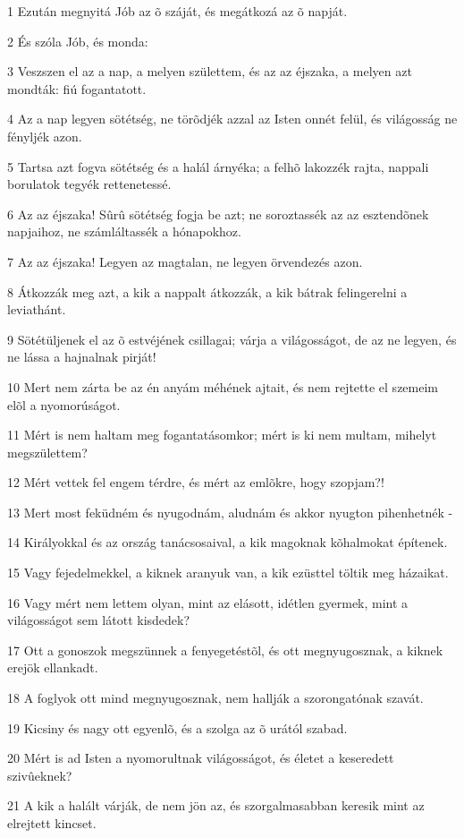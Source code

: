 \par 1 Ezután megnyitá Jób az õ száját, és megátkozá az õ napját.
\par 2 És szóla Jób, és monda:
\par 3 Veszszen el az a nap, a melyen születtem, és az az éjszaka, a melyen azt mondták: fiú fogantatott.
\par 4 Az a nap legyen sötétség, ne törõdjék azzal az Isten onnét felül, és világosság ne fényljék azon.
\par 5 Tartsa azt fogva sötétség és a halál árnyéka; a felhõ lakozzék rajta, nappali borulatok tegyék rettenetessé.
\par 6 Az az éjszaka! Sûrû sötétség fogja be azt; ne soroztassék az az esztendõnek napjaihoz, ne számláltassék a hónapokhoz.
\par 7 Az az éjszaka! Legyen az magtalan, ne legyen örvendezés azon.
\par 8 Átkozzák meg azt, a kik a nappalt átkozzák, a kik bátrak felingerelni a leviathánt.
\par 9 Sötétüljenek el az õ estvéjének csillagai; várja a világosságot, de az ne legyen, és ne lássa a hajnalnak pirját!
\par 10 Mert nem zárta be az én anyám méhének ajtait, és nem rejtette el szemeim elõl a nyomorúságot.
\par 11 Mért is nem haltam meg fogantatásomkor; mért is ki nem multam, mihelyt megszülettem?
\par 12 Mért vettek fel engem térdre, és mért az emlõkre, hogy szopjam?!
\par 13 Mert most feküdném és nyugodnám, aludnám és akkor nyugton pihenhetnék -
\par 14 Királyokkal és az ország tanácsosaival, a kik magoknak kõhalmokat építenek.
\par 15 Vagy fejedelmekkel, a kiknek aranyuk van, a kik ezüsttel töltik meg házaikat.
\par 16 Vagy mért nem lettem olyan, mint az elásott, idétlen gyermek, mint a világosságot sem látott kisdedek?
\par 17 Ott a gonoszok megszünnek a fenyegetéstõl, és ott megnyugosznak, a kiknek erejök ellankadt.
\par 18 A foglyok ott mind megnyugosznak, nem hallják a szorongatónak szavát.
\par 19 Kicsiny és nagy ott egyenlõ, és a szolga az õ urától szabad.
\par 20 Mért is ad Isten a nyomorultnak világosságot, és életet a keseredett szivûeknek?
\par 21 A kik a halált várják, de nem jön az, és szorgalmasabban keresik mint az elrejtett kincset.
